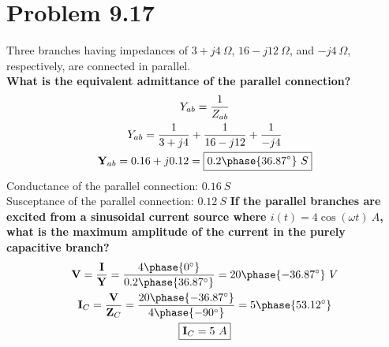 \documentclass[12pt]{article}
\begin{document}
    \section*{Problem 9.17}
    Three branches having impedances of $3 + j 4\ \Omega$, $16 - j 12\ \Omega$,
    and $-j 4\ \Omega$, respectively, are connected in parallel. \\
    \textbf{What is the equivalent admittance of the parallel connection?}
    \begin{gather*}
        Y_{ab} = \frac{1}{Z_{ab}} \\
        Y_{ab} = \frac{1}{3 + j 4} + \frac{1}{16 - j 12} + \frac{1}{-j 4} \\
        \textbf{Y}_{ab} = 0.16 + j 0.12 = \boxed{0.2 \phase{36.87^{\circ}}\ S}
    \end{gather*}
    Conductance of the parallel connection: $\boxed{0.16\ S}$ \\
    Susceptance of the parallel connection: $\boxed{0.12\ S}$
    \newpage
    \noindent\textbf{If the parallel branches are excited from a sinusoidal
    current source where $i(t) = 4 \cos (\omega t)\ A$, what is the maximum
    amplitude of the current in the purely capacitive branch?}
    \begin{gather*}
        \textbf{V} = \frac{\textbf{I}}{\textbf{Y}} = \frac{4
        \phase{0^{\circ}}}{0.2 \phase{36.87^{\circ}}} = 20
        \phase{-36.87^{\circ}}\ V \\
        \textbf{I}_{C} = \frac{\textbf{V}}{\textbf{Z}_{C}} = \frac{20
        \phase{-36.87^{\circ}}}{4 \phase{-90^{\circ}}} = 5 \phase{53.12^{\circ}}
        \\
        \boxed{\textbf{I}_{C} = 5\ A}
    \end{gather*}
\end{document}
